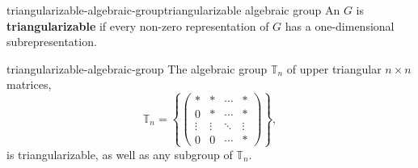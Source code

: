 \begin{topic}{triangularizable-algebraic-group}{triangularizable algebraic group}
    An  $G$ is \textbf{triangularizable} if every non-zero representation of $G$ has a one-dimensional subrepresentation.
\end{topic}

\begin{example}{triangularizable-algebraic-group}
    The algebraic group $\mathbb{T}_n$ of upper triangular $n \times n$ matrices,
    \[ \mathbb{T}_n = \left\{ \begin{pmatrix} * & * & \cdots & * \\ 0 & * & \cdots & * \\ \vdots & \vdots & \ddots & \vdots \\ 0 & 0 & \cdots & * \end{pmatrix} \right\} , \]
    is triangularizable, as well as any subgroup of $\mathbb{T}_n$.
\end{example}

